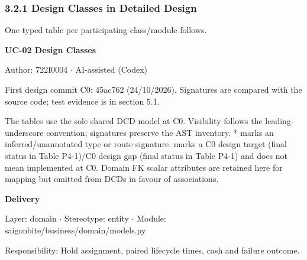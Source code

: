 \subsubsection*{3.2.1 Design Classes in Detailed Design}
One typed table per participating class/module follows.

\textbf{UC-02 Design Classes}

Author: 722I0004 \ensuremath{\cdot} AI-assisted (Codex)

First design commit C0: 45ac762 (24/10/2026). Signatures are compared with the source code; test evidence is in section 5.1.

The tables use the sole shared DCD model at C0. Visibility follows the leading-underscore convention; signatures preserve the AST inventory. * marks an inferred/unannotated type or route signature.  marks a C0 design target (final status in Table P4-1)/C0 design gap (final status in Table P4-1) and does not mean implemented at C0. Domain FK scalar attributes are retained here for mapping but omitted from DCDs in favour of associations.

\textbf{Delivery}

Layer: domain \ensuremath{\cdot} Stereotype: \guillemotleft{}entity\guillemotright{} \ensuremath{\cdot} Module: saigonbite/business/domain/models.py

Responsibility: Hold assignment, paired lifecycle times, cash and failure outcome.

